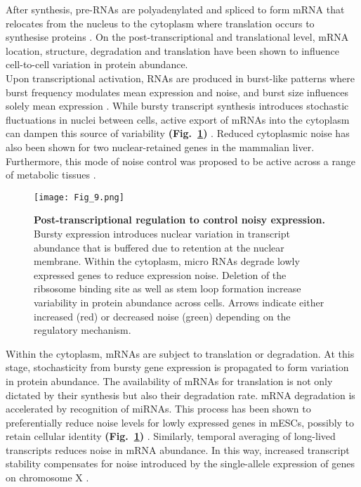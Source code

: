 After synthesis, pre-RNAs are polyadenylated and spliced to form mRNA that relocates from the nucleus to the cytoplasm where translation occurs to synthesise proteins \cite{Glisovic2008}. On the post-transcriptional and translational level, mRNA location, structure, degradation and translation have been shown to influence cell-to-cell variation in protein abundance.\\

Upon transcriptional activation, RNAs are produced in burst-like patterns where burst frequency modulates mean expression and noise, and burst size influences solely mean expression \citep{Hornung2012}. While bursty transcript synthesis introduces stochastic fluctuations in nuclei between cells, active export of mRNAs into the cytoplasm can dampen this source of variability \textbf{(Fig.~\ref{fig0:posttranscriptional})} \citep{Battich2015a}. Reduced cytoplasmic noise has also been shown for two nuclear-retained genes in the mammalian liver. Furthermore, this mode of noise control was proposed to be active across a range of metabolic tissues \cite{BaharHalpern2015a}.\\

\begin{figure}[!h]
\centering
\texttt{[image: Fig\_9.png]}
\caption[Post-transcriptional regulation to control noisy expression]{\textbf{Post-transcriptional regulation to control noisy expression.}\\
Bursty expression introduces nuclear variation in transcript abundance that is buffered due to retention at the nuclear membrane. Within the cytoplasm, micro RNAs degrade lowly expressed genes to reduce expression noise. Deletion of the ribsosome binding site as well as stem loop formation increase variability in protein abundance across cells. Arrows indicate either increased (red) or decreased noise (green) depending on the regulatory mechanism.}
\label{fig0:posttranscriptional}
\end{figure} 

\newpage

Within the cytoplasm, mRNAs are subject to translation or degradation. At this stage, stochasticity from bursty gene expression is propagated to form variation in protein abundance. The availability of mRNAs for translation is not only dictated by their synthesis but also their degradation rate. mRNA degradation is accelerated by recognition of \glspl{miRNA}. This process has been shown to preferentially reduce noise levels for lowly expressed genes in mESCs, possibly to retain cellular identity \textbf{(Fig.~\ref{fig0:posttranscriptional})} \citep{Schmiedel2015}. Similarly, temporal averaging of long-lived transcripts reduces noise in mRNA abundance. In this way, increased transcript stability compensates for noise introduced by the single-allele expression of genes on chromosome X \citep{Faure2017}.  \\

